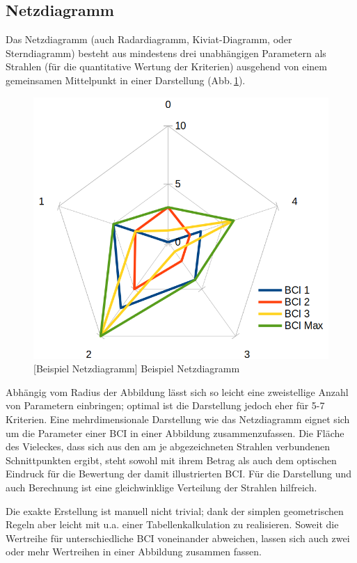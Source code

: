 \subsection{Netzdiagramm}\label{dep:web}

Das Netzdiagramm (auch Radardiagramm, Kiviat-Diagramm, oder Sterndiagramm) besteht aus mindestens drei unabhängigen Parametern als Strahlen (für die quantitative Wertung der Kriterien) ausgehend von einem gemeinsamen Mittelpunkt in einer Darstellung (Abb.\,\ref{disp:web:pic}).

\begin{figure}[!htp]
\centering
\includegraphics[width=.6\textwidth]{img/disp-web}
[Beispiel Netzdiagramm]{\label{disp:web:pic} Beispiel Netzdiagramm}
\end{figure}

Abhängig vom Radius der Abbildung lässt sich so leicht eine zweistellige Anzahl von Parametern einbringen;
optimal ist die Darstellung jedoch eher für 5-7 Kriterien.
Eine mehrdimensionale Darstellung wie das Netzdiagramm eignet sich um die Parameter einer \gls{BCI} in einer Abbildung zusammenzufassen.
Die Fläche des Vieleckes, dass sich aus den am je abgezeichneten Strahlen verbundenen Schnittpunkten ergibt, steht sowohl mit ihrem Betrag als auch dem optischen Eindruck für die Bewertung der damit illustrierten \gls{BCI}.
Für die Darstellung und auch Berechnung ist eine gleichwinklige Verteilung der Strahlen hilfreich.

Die exakte Erstellung ist manuell nicht trivial; dank der simplen geometrischen Regeln aber leicht mit u.a. einer Tabellenkalkulation zu realisieren.
Soweit die Wertreihe für unterschiedliche \gls{BCI} voneinander abweichen, lassen sich auch zwei oder mehr Wertreihen in einer Abbildung zusammen fassen.

